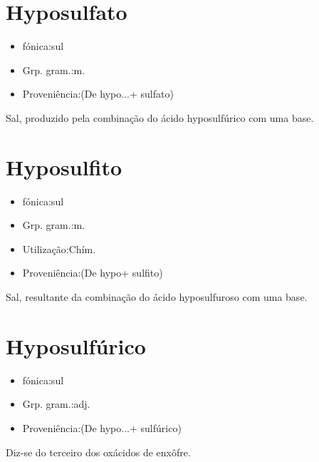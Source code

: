\documentclass{article}
\begin{document}
\section{Hyposulfato}
\begin{itemize}
\item {fónica:sul}
\end{itemize}
\begin{itemize}
\item {Grp. gram.:m.}
\end{itemize}
\begin{itemize}
\item {Proveniência:(De \textunderscore hypo...\textunderscore  + \textunderscore sulfato\textunderscore )}
\end{itemize}
Sal, produzido pela combinação do ácido hyposulfúrico com uma base.
\section{Hyposulfito}
\begin{itemize}
\item {fónica:sul}
\end{itemize}
\begin{itemize}
\item {Grp. gram.:m.}
\end{itemize}
\begin{itemize}
\item {Utilização:Chím.}
\end{itemize}
\begin{itemize}
\item {Proveniência:(De \textunderscore hypo\textunderscore  + \textunderscore sulfito\textunderscore )}
\end{itemize}
Sal, resultante da combinação do ácido hyposulfuroso com uma base.
\section{Hyposulfúrico}
\begin{itemize}
\item {fónica:sul}
\end{itemize}
\begin{itemize}
\item {Grp. gram.:adj.}
\end{itemize}
\begin{itemize}
\item {Proveniência:(De \textunderscore hypo...\textunderscore  + \textunderscore sulfúrico\textunderscore )}
\end{itemize}
Diz-se do terceiro dos oxácidos de enxôfre.
\end{document}

